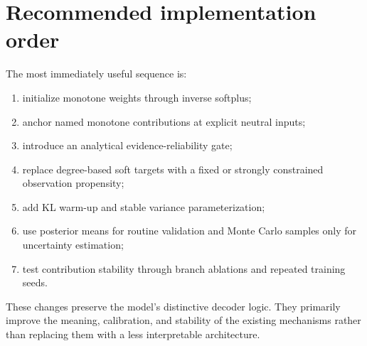 \documentclass[11pt,a4paper]{article}
\begin{document}
\section{Recommended implementation order}

The most immediately useful sequence is:

\begin{enumerate}
  \item initialize monotone weights through inverse softplus;
  \item anchor named monotone contributions at explicit neutral inputs;
  \item introduce an analytical evidence-reliability gate;
  \item replace degree-based soft targets with a fixed or strongly constrained
        observation propensity;
  \item add KL warm-up and stable variance parameterization;
  \item use posterior means for routine validation and Monte Carlo samples only
        for uncertainty estimation;
  \item test contribution stability through branch ablations and repeated
        training seeds.
\end{enumerate}

These changes preserve the model's distinctive decoder logic. They primarily
improve the meaning, calibration, and stability of the existing mechanisms
rather than replacing them with a less interpretable architecture.
\end{document}
